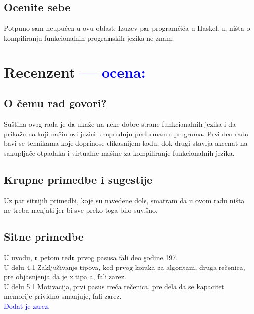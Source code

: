 \documentclass[a4paper]{report}
\newcommand{\odgovor}[1]{\textcolor{blue}{#1}}
\begin{document}
\section{Ocenite sebe}
Potpuno sam neupućen u ovu oblast. Izuzev par programčića u Haskell-u, ništa o kompiliranju funkcionalnih programskih jezika ne znam.

\chapter{Recenzent \odgovor{--- ocena:} }


\section{O čemu rad govori?}
Suština ovog rada je da ukaže na neke dobre strane funkcionalnih jezika i da prikaže na koji način ovi jezici unapređuju performanse programa.
Prvi deo rada bavi se tehnikama koje doprinose efikasnijem kodu, dok drugi stavlja akcenat na sakupljače otpadaka i virtualne mašine za kompiliranje funkcionalnih jezika. 

\section{Krupne primedbe i sugestije}
Uz par sitnijih primedbi, koje su navedene dole, smatram da u ovom radu ništa ne treba menjati jer bi sve preko toga bilo suvišno.


\section{Sitne primedbe}

U uvodu, u petom redu prvog pasusa fali deo godine 197. \\
U delu 4.1 Zaključivanje tipova, kod prvog koraka za algoritam, druga rečenica, pre objasnjenja da je x tipa a, fali zarez. \\
U delu 5.1 Motivacija, prvi pasus treća rečenica, pre dela da se kapacitet memorije prividno smanjuje, fali zarez. \\
\odgovor{Dodat je zarez.}
\end{document}
